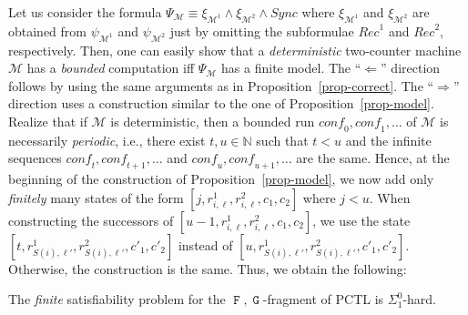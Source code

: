 \documentclass[a4paper,UKenglish,cleveref, autoref, thm-restate]{lipics-v2021}
\newcommand{\N}{\mathbb{N}}
\newcommand{\M}{\mathcal{M}}
\newcommand{\conf}{\textit{conf}}
\newcommand{\Rec}{\textit{Rec}}
\newcommand{\Sync}{\textit{Sync}}
\newcommand*{\opf}{\operatorname{\pmb{\mathtt{F}}}}
\newcommand*{\opg}{\operatorname{\pmb{\mathtt{G}}}}
\begin{document}
Let us consider the formula $\Psi_\M \equiv \xi_{\M^1} \wedge \xi_{\M^2} \wedge \Sync$ where $\xi_{\M^1}$ and  $\xi_{\M^2}$ are obtained from $\psi_{\M^1}$ and  $\psi_{\M^2}$ just by omitting the subformulae $\Rec^1$ and $\Rec^2$, respectively.
Then, one can easily show that a \emph{deterministic} two-counter machine $\M$ has a \emph{bounded} computation iff $\Psi_\M$ has a finite model. The ``$\Leftarrow$'' direction follows by using the same arguments as in Proposition~\ref{prop-correct}. The ``$\Rightarrow$'' direction uses a construction similar to the one of Proposition~\ref{prop-model}. Realize that if $\M$ is deterministic, then a bounded run $\conf_0,\conf_1,\ldots$ of $\M$ is necessarily \emph{periodic}, i.e., there exist $t,u \in \N$ such that $t < u$ and the infinite sequences $\conf_t,\conf_{t+1},\ldots$ and $\conf_u,\conf_{u+1},\ldots$ are the same. Hence, at the beginning of the construction of Proposition~\ref{prop-model}, we now add only \emph{finitely} many states of the form $[j,r^1_{i,\ell},r^2_{i,\ell},c_1,c_2]$ where $j<u$. When constructing the successors of $[u-1,r^1_{i,\ell},r^2_{i,\ell},c_1,c_2]$, we use the state $[t,r^1_{S(i),\ell'},r^2_{S(i),\ell'},c'_1,c'_2]$ instead of $[u,r^1_{S(i),\ell'},r^2_{S(i),\ell'},c'_1,c'_2]$. Otherwise, the construction is the same.
Thus, we obtain the following:

\begin{corollary}
    The \emph{finite} satisfiability problem for the $\opf,\opg$-fragment of PCTL is $\Sigma^0_1$-hard.
\end{corollary}
 
\end{document}
